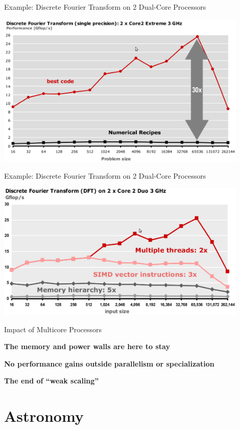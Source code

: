 \documentclass[xcolor=dvipsnames,9pt,mathserif]{beamer}
\begin{document}
\begin{frame}{Example: Discrete Fourier Transform on 2
    Dual-Core Processors}
  \begin{center}
    \includegraphics[width=12cm]{dft1.png}
  \end{center}
\end{frame}

\begin{frame}{Example: Discrete Fourier Transform on 2
    Dual-Core Processors}
  \begin{center}
    \includegraphics[width=12cm]{dft2.png}
  \end{center}
\end{frame}

\begin{frame}[c]{Impact of Multicore Processors}

  {\large \textbf{The memory and power walls are here to stay}}

  \bigskip
  {\large \textbf{No performance gains outside parallelism or specialization}}

  \bigskip
  {\large \textbf{The end of ``weak scaling''}}
\end{frame}

\section{Astronomy}
\end{document}
